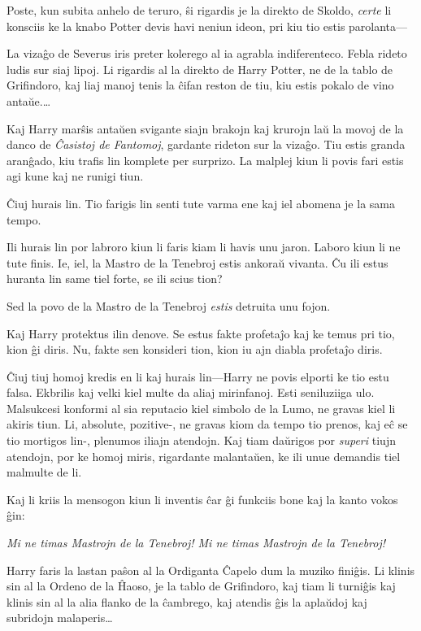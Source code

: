 Poste, kun subita anhelo de teruro, ŝi rigardis je la direkto de
Skoldo, \emph{certe} li konsciis ke la knabo Potter devis havi neniun
ideon, pri kiu tio estis parolanta—

La vizaĝo de Severus iris preter kolerego al ia agrabla
indiferenteco. Febla rideto ludis sur siaj lipoj. Li rigardis al la
direkto de Harry Potter, ne de la tablo de Grifindoro, kaj liaj manoj
tenis la ĉifan reston de tiu, kiu estis pokalo de vino antaŭe.\ldots

Kaj Harry marŝis antaŭen svigante siajn brakojn kaj krurojn laŭ la
movoj de la danco de \emph{Ĉasistoj de Fantomoj}, gardante rideton sur la
vizaĝo. Tiu estis granda aranĝado, kiu trafis lin komplete per
surprizo. La malplej kiun li povis fari estis agi kune kaj ne runigi
tiun.

Ĉiuj hurais lin. Tio farigis lin senti tute varma ene kaj iel abomena
je la sama tempo.

Ili hurais lin por labroro kiun li faris kiam li havis unu
jaron. Laboro kiun li ne tute finis. Ie, iel, la Mastro de la Tenebroj
estis ankoraŭ vivanta. Ĉu ili estus huranta lin same tiel forte, se ili
scius tion?

Sed la povo de la Mastro de la Tenebroj \emph{estis} detruita unu
fojon.

Kaj Harry protektus ilin denove. Se estus fakte profetaĵo kaj ke temus
pri tio, kion ĝi diris. Nu, fakte sen konsideri tion, kion iu ajn
diabla profetaĵo diris.

Ĉiuj tiuj homoj kredis en li kaj hurais lin—Harry ne povis elporti ke
tio estu falsa. Ekbrilis kaj velki kiel multe da aliaj
mirinfanoj. Esti seniluziiga ulo. Malsukcesi konformi al sia reputacio
kiel simbolo de la Lumo, ne gravas kiel li akiris tiun. Li, absolute,
pozitive-, ne gravas kiom da tempo tio prenos, kaj eĉ se tio mortigos
lin-, plenumos iliajn atendojn. Kaj tiam daŭrigos por \emph{superi}
tiujn atendojn, por ke homoj miris, rigardante malantaŭen, ke ili unue
demandis tiel malmulte de li.

Kaj li kriis la mensogon kiun li inventis ĉar ĝi funkciis bone kaj la
kanto vokos ĝin:

\emph{Mi ne timas Mastrojn de la Tenebroj! Mi ne timas Mastrojn de la Tenebroj!}

Harry faris la lastan paŝon al la Ordiganta Ĉapelo dum la muziko
finiĝis. Li klinis sin al la Ordeno de la Ĥaoso, je la tablo de
Grifindoro, kaj tiam li turniĝis kaj klinis sin al la alia flanko de
la ĉambrego, kaj atendis ĝis la aplaŭdoj kaj subridojn malaperis\ldots

